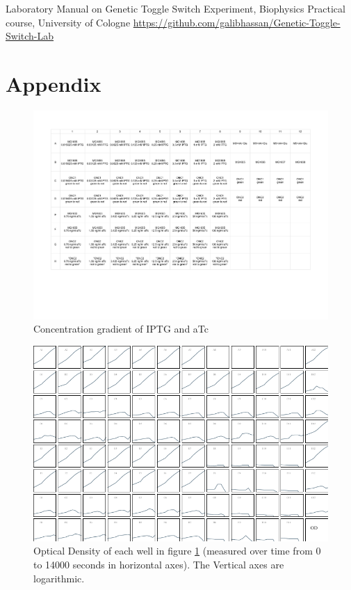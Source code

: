 \documentclass[english,11pt,a4paper]{article}
\begin{document}
\begin{thebibliography}{999}
	Laboratory Manual on Genetic Toggle Switch Experiment, Biophysics Practical course, University of Cologne
    	\url{https://github.com/galibhassan/Genetic-Toggle-Switch-Lab}
\end{thebibliography}







\pagebreak
\part{Appendix}



\begin{figure}[h]
\centering
\includegraphics[scale=0.7, angle=-90, origin=c]{concentrationGradient}
\caption{Concentration gradient of IPTG and aTc}
\label{concGrad}
\end{figure}

\pagebreak

\begin{figure}[htbp]
\centering
\includegraphics[scale=1.5, angle=-90, origin=c]{OD-LogPlot.pdf}
\caption{
Optical Density of each well in figure \ref{concGrad} (measured over time from 0 to 14000 seconds in horizontal axes). The Vertical axes are logarithmic.}
\label{ODLogPlot}
\end{figure}
\end{document}
